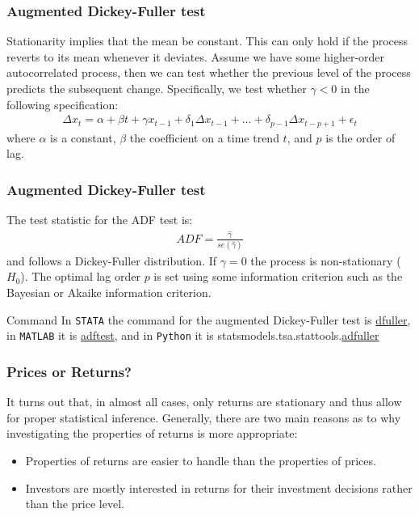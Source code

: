 \documentclass[xcolor=dvipsnames, english, 8pt]{beamer}
\begin{document}
\begin{frame}[label=Dickey]
    \frametitle{Augmented Dickey-Fuller test}
   Stationarity implies that the mean be constant. This can only hold if the process reverts to its mean whenever it deviates. Assume we have some higher-order autocorrelated process, then we can test whether the previous level of the process predicts the subsequent change. Specifically, we test whether $\gamma < 0 $ in the following specification:
    \begin{align}
        \Delta x_t = \alpha + \beta t + \gamma x_{t-1} + \delta_1 \Delta x_{t-1} + \hdots + \delta_{p-1} \Delta x_{t-p+1} + \epsilon_t
    \end{align}
    where $\alpha$ is a constant, $\beta$ the coefficient on a time trend $t$, and $p$ is the order of lag. 

\end{frame}

\begin{frame}
    \frametitle{Augmented Dickey-Fuller test}
   The test statistic for the ADF test is:
    \begin{align}
        ADF = \frac{\hat{\gamma}}{se(\hat{\gamma})}
    \end{align}
    and follows a Dickey-Fuller distribution. If $\gamma = 0$ the process is non-stationary ($H_0$). The optimal lag order $p$ is set using some information criterion such as the Bayesian or Akaike information criterion.
    \vfill
    \begin{exampleblock}{{\small{Command}}}
    In  \texttt{STATA} the command for the augmented Dickey-Fuller test is \href{https://www.stata.com/manuals13/tsdfuller.pdf}{\color{Purple}dfuller}, in  \texttt{MATLAB} it is \href{https://ch.mathworks.com/help/econ/adftest.html}{\color{Purple}adftest}, and in \texttt{Python} it is statsmodels.tsa.stattools.\href{https://www.statsmodels.org/dev/generated/statsmodels.tsa.stattools.adfuller.html}{\color{Purple}adfuller}
    \end{exampleblock}

\end{frame}

\begin{frame}
    \frametitle{Prices or Returns?}
    It turns out that, in almost all cases, only returns are stationary and thus allow for proper statistical inference. Generally, there are two main reasons as to why investigating the properties of returns is more appropriate:\vspace{0.25cm}\\
    \begin{itemize}
        \item Properties of returns are easier to handle than the properties of prices.
        \item Investors are mostly interested in returns for their investment decisions rather than the price level.
    \end{itemize}

\end{frame}
\end{document}
